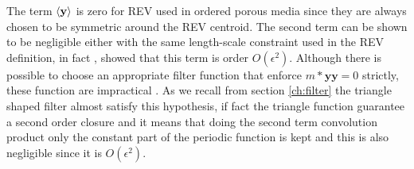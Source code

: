 The term ${\left< \mathbf{y} \right>}$ is zero for REV used in ordered porous media since they are always chosen to be symmetric around the REV centroid.
The second term can be shown to be negligible either with the same length-scale constraint used in the REV definition, in fact \citet{ochoa1995momentum}, \citet{paez2017macroscopic} showed that this term is order $O(\epsilon^2)$.
Although there is possible to choose an appropriate filter function that  enforce $m*\mathbf{y}\mathbf{y} =0$ strictly, these function are impractical \citet{davit2017technical}.
As we recall from section \ref{ch:filter} the triangle shaped filter almost satisfy this hypothesis, if fact the triangle function guarantee a second order closure and it means that doing the second term convolution product only the constant part of the periodic function is kept and this is also negligible since it is $O(\epsilon^2)$.
